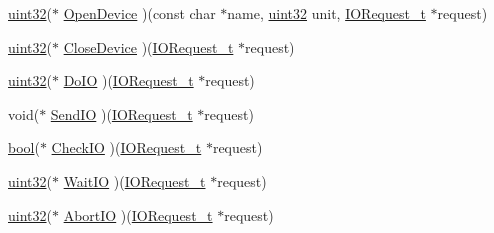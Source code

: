 \begin{DoxyCompactItemize}
\item 
\hyperlink{type_8h_acbd4acd0d29e2d6c43104827f77d9cd2}{uint32}($\ast$ \hyperlink{structIExec__t_a8a22f0677d3cb7add6a91fd9f535a68a}{Open\+Device} )(const char $\ast$name, \hyperlink{type_8h_acbd4acd0d29e2d6c43104827f77d9cd2}{uint32} unit, \hyperlink{structIORequest__t}{I\+O\+Request\+\_\+t} $\ast$request)
\item 
\hyperlink{type_8h_acbd4acd0d29e2d6c43104827f77d9cd2}{uint32}($\ast$ \hyperlink{structIExec__t_a4af8d0a31d2f53e3b4b6e95a984d70ab}{Close\+Device} )(\hyperlink{structIORequest__t}{I\+O\+Request\+\_\+t} $\ast$request)
\item 
\hyperlink{type_8h_acbd4acd0d29e2d6c43104827f77d9cd2}{uint32}($\ast$ \hyperlink{structIExec__t_adfd1dc0bd8f0bd8d419573e6c6ad4907}{Do\+I\+O} )(\hyperlink{structIORequest__t}{I\+O\+Request\+\_\+t} $\ast$request)
\item 
void($\ast$ \hyperlink{structIExec__t_aa702c2f17347a64369b3d308cfa52491}{Send\+I\+O} )(\hyperlink{structIORequest__t}{I\+O\+Request\+\_\+t} $\ast$request)
\item 
\hyperlink{type_8h_af6a258d8f3ee5206d682d799316314b1}{bool}($\ast$ \hyperlink{structIExec__t_a35a562316fd274c0c6980d1dcba532cc}{Check\+I\+O} )(\hyperlink{structIORequest__t}{I\+O\+Request\+\_\+t} $\ast$request)
\item 
\hyperlink{type_8h_acbd4acd0d29e2d6c43104827f77d9cd2}{uint32}($\ast$ \hyperlink{structIExec__t_a802bead383402b49d32965b5713e079f}{Wait\+I\+O} )(\hyperlink{structIORequest__t}{I\+O\+Request\+\_\+t} $\ast$request)
\item 
\hyperlink{type_8h_acbd4acd0d29e2d6c43104827f77d9cd2}{uint32}($\ast$ \hyperlink{structIExec__t_a6002eecac16603535f0868151903fd12}{Abort\+I\+O} )(\hyperlink{structIORequest__t}{I\+O\+Request\+\_\+t} $\ast$request)
\end{DoxyCompactItemize}


